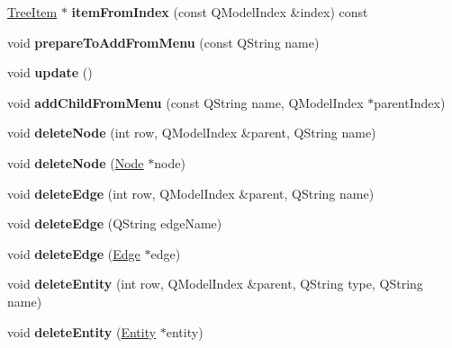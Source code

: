 \begin{DoxyCompactItemize}
\hyperlink{class_tree_item}{Tree\+Item} $\ast$ {\bfseries item\+From\+Index} (const Q\+Model\+Index \&index) const
\item 
\mbox{\label{class_tree_model_a13ab1d3cc6bfd8e3d5180ece5a630fda}} 
void {\bfseries prepare\+To\+Add\+From\+Menu} (const Q\+String name)
\item 
\mbox{\label{class_tree_model_a919a8079a6a13aebff271f7fa47c57e5}} 
void {\bfseries update} ()
\item 
\mbox{\label{class_tree_model_aee89b34d42169817be057a7baf3e6af2}} 
void {\bfseries add\+Child\+From\+Menu} (const Q\+String name, Q\+Model\+Index $\ast$parent\+Index)
\item 
\mbox{\label{class_tree_model_a26cbe86642bceb5c6af59aa74eb1bf7a}} 
void {\bfseries delete\+Node} (int row, Q\+Model\+Index \&parent, Q\+String name)
\item 
\mbox{\label{class_tree_model_a5a904b7b76230729d45cb4be0ae3ede2}} 
void {\bfseries delete\+Node} (\hyperlink{class_node}{Node} $\ast$node)
\item 
\mbox{\label{class_tree_model_a483840d4c1c4868798ed5cbeabcea6a7}} 
void {\bfseries delete\+Edge} (int row, Q\+Model\+Index \&parent, Q\+String name)
\item 
\mbox{\label{class_tree_model_a481bc9e59f09484004971c23593fed92}} 
void {\bfseries delete\+Edge} (Q\+String edge\+Name)
\item 
\mbox{\label{class_tree_model_aef2d6966850afe5f8ab08f2635318142}} 
void {\bfseries delete\+Edge} (\hyperlink{class_edge}{Edge} $\ast$edge)
\item 
\mbox{\label{class_tree_model_afdda4a2f25e993d05f51f8a99c7794bf}} 
void {\bfseries delete\+Entity} (int row, Q\+Model\+Index \&parent, Q\+String type, Q\+String name)
\item 
\mbox{\label{class_tree_model_a3ebcf92fbb5a2a8f5e1038b5b2515820}} 
void {\bfseries delete\+Entity} (\hyperlink{class_entity}{Entity} $\ast$entity)

\end{DoxyCompactItemize}
